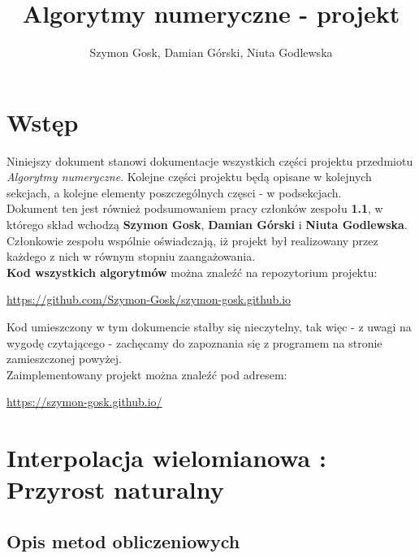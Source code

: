 \documentclass[a4paper,12pt]{article}
\title{Algorytmy numeryczne - projekt}
\author{Szymon Gosk, Damian Górski, Niuta Godlewska}
\newcommand{\id}{\noindent}
\newcommand{\bl}[1]{\textbf{#1}}
\begin{document}
\maketitle

\newpage

\tableofcontents

\newpage

\section{Wstęp}

Niniejszy dokument stanowi dokumentacje wszystkich części projektu przedmiotu \textit{Algorytmy numeryczne}. Kolejne części projektu będą opisane w kolejnych sekcjach, a kolejne elementy poszczególnych częsci - w podsekcjach. \\

\id
Dokument ten jest również podsumowaniem pracy członków zespołu \textbf{1.1}, w którego skład wchodzą \textbf{Szymon Gosk}, \textbf{Damian Górski} i \textbf{Niuta Godlewska}. Członkowie zespołu wspólnie oświadczają, iż projekt był realizowany przez każdego z nich w równym stopniu zaangażowania. \\

\id
\bl{Kod wszystkich algorytmów} można znaleźć na repozytorium projektu:
\begin{center}
\textcolor{blue}{\href{https://github.com/Szymon-Gosk/szymon-gosk.github.io}{https://github.com/Szymon-Gosk/szymon-gosk.github.io}}
\end{center}
Kod umieszczony w tym dokumencie stałby się nieczytelny, tak więc - z uwagi na wygodę czytającego - zachęcamy do zapoznania się z programem na stronie zamieszczonej powyżej. \\

\id
Zaimplementowany projekt można znaleźć pod adresem: 
\begin{center}
\textcolor{blue}{\href{https://szymon-gosk.github.io/}{https://szymon-gosk.github.io/}}
\end{center}

\section{Interpolacja wielomianowa : Przyrost naturalny}

\subsection{Opis metod obliczeniowych}
\end{document}
